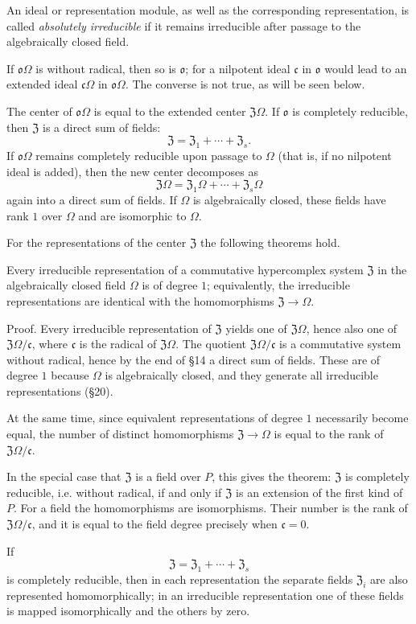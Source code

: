 \documentclass[11pt]{article}
\providecommand{\mo}{\mathfrak{o}}
\providecommand{\mc}{\mathfrak{c}}
\providecommand{\mZ}{\mathfrak{Z}}
\begin{document}
An ideal or representation module, as well as the corresponding representation, is called \emph{absolutely irreducible} if it remains irreducible after passage to the algebraically closed field.

If $\mo\Omega$ is without radical, then so is $\mo$; for a nilpotent ideal $\mc$ in $\mo$ would lead to an extended ideal $\mc\Omega$ in $\mo\Omega$. The converse is not true, as will be seen below.

The center of $\mo\Omega$ is equal to the extended center $\mZ\Omega$. If $\mo$ is completely reducible, then $\mZ$ is a direct sum of fields:
\[
        \mZ=\mZ_1+\cdots+\mZ_s.
\]
If $\mo\Omega$ remains completely reducible upon passage to $\Omega$ (that is, if no nilpotent ideal is added), then the new center decomposes as
\[
        \mZ\Omega=\mZ_1\Omega+\cdots+\mZ_s\Omega
\]
again into a direct sum of fields. If $\Omega$ is algebraically closed, these fields have rank $1$ over $\Omega$ and are isomorphic to $\Omega$.

For the representations of the center $\mZ$ the following theorems hold.

Every irreducible representation of a commutative hypercomplex system $\mZ$ in the algebraically closed field $\Omega$ is of degree $1$; equivalently, the irreducible representations are identical with the homomorphisms $\mZ\to\Omega$.

Proof. Every irreducible representation of $\mZ$ yields one of $\mZ\Omega$, hence also one of $\mZ\Omega/\mc$, where $\mc$ is the radical of $\mZ\Omega$. The quotient $\mZ\Omega/\mc$ is a commutative system without radical, hence by the end of §14 a direct sum of fields. These are of degree $1$ because $\Omega$ is algebraically closed, and they generate all irreducible representations (§20).

At the same time, since equivalent representations of degree $1$ necessarily become equal, the number of distinct homomorphisms $\mZ\to\Omega$ is equal to the rank of $\mZ\Omega/\mc$.

In the special case that $\mZ$ is a field over $P$, this gives the theorem: $\mZ$ is completely reducible, i.e. without radical, if and only if $\mZ$ is an extension of the first kind of $P$. For a field the homomorphisms are isomorphisms. Their number is the rank of $\mZ\Omega/\mc$, and it is equal to the field degree precisely when $\mc=0$.

If
\[
        \mZ=\mZ_1+\cdots+\mZ_s
\]
is completely reducible, then in each representation the separate fields $\mZ_i$ are also represented homomorphically; in an irreducible representation one of these fields is mapped isomorphically and the others by zero.
\end{document}
